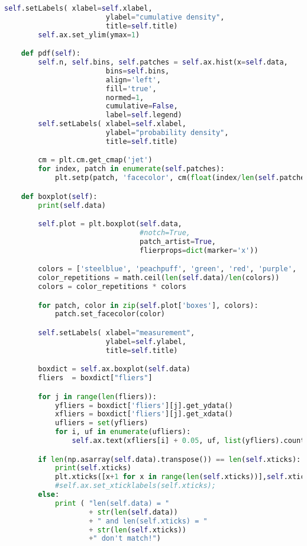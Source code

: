 \begin{lstlisting}[language=Python,caption=myplot.py]
        self.setLabels( xlabel=self.xlabel,
                        ylabel="cumulative density",
                        title=self.title)
        self.ax.set_ylim(ymax=1)

    def pdf(self):
        self.n, self.bins, self.patches = self.ax.hist(x=self.data,
                        bins=self.bins,
                        align='left',
                        fill='true',
                        normed=1,
                        cumulative=False,
                        label=self.legend)
        self.setLabels( xlabel=self.xlabel,
                        ylabel="probability density",
                        title=self.title)

        cm = plt.cm.get_cmap('jet')
        for index, patch in enumerate(self.patches):
            plt.setp(patch, 'facecolor', cm(float(index/len(self.patches))))

    def boxplot(self):
        print(self.data)

        self.plot = plt.boxplot(self.data,
                                #notch=True,
                                patch_artist=True,
                                flierprops=dict(marker='x'))

        colors = ['steelblue', 'peachpuff', 'green', 'red', 'purple', 'brown', 'pink']
        color_repetitions = math.ceil(len(self.data)/len(colors))
        colors = color_repetitions * colors

        for patch, color in zip(self.plot['boxes'], colors):
            patch.set_facecolor(color)

        self.setLabels( xlabel="measurement",
                        ylabel=self.ylabel,
                        title=self.title)

        boxdict = self.ax.boxplot(self.data)
        fliers  = boxdict["fliers"]

        for j in range(len(fliers)):
            yfliers = boxdict['fliers'][j].get_ydata()
            xfliers = boxdict['fliers'][j].get_xdata()
            ufliers = set(yfliers)
            for i, uf in enumerate(ufliers):
                self.ax.text(xfliers[i] + 0.05, uf, list(yfliers).count(uf))

        if len(np.asarray(self.data).transpose()) == len(self.xticks):
            print(self.xticks)
            plt.xticks([x+1 for x in range(len(self.xticks))],self.xticks)
            #self.ax.set_xticklabels(self.xticks);
        else:
            print ( "len(self.data) = "
                    + str(len(self.data))
                    + " and len(self.xticks) = "
                    + str(len(self.xticks))
                    +" don't match!")


\end{lstlisting}
